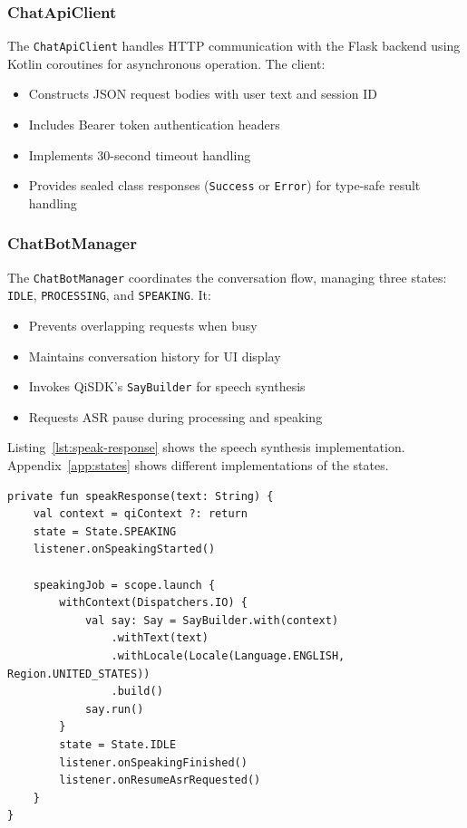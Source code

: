 \documentclass[a4paper]{article}
\begin{document}
\subsubsection{ChatApiClient}

The \texttt{ChatApiClient} handles HTTP communication with the Flask backend using Kotlin coroutines for asynchronous operation. The client:

\begin{itemize}[noitemsep]
    \item Constructs JSON request bodies with user text and session ID
    \item Includes Bearer token authentication headers
    \item Implements 30-second timeout handling
    \item Provides sealed class responses (\texttt{Success} or \texttt{Error}) for type-safe result handling
\end{itemize}

\subsubsection{ChatBotManager}

The \texttt{ChatBotManager} coordinates the conversation flow, managing three states: \texttt{IDLE}, \texttt{PROCESSING}, and \texttt{SPEAKING}. It:

\begin{itemize}[noitemsep]
    \item Prevents overlapping requests when busy
    \item Maintains conversation history for UI display
    \item Invokes QiSDK's \texttt{SayBuilder} for speech synthesis
    \item Requests ASR pause during processing and speaking
\end{itemize}

Listing~\ref{lst:speak-response} shows the speech synthesis implementation.\\
Appendix~\ref{app:states} shows different implementations of the states.
\begin{lstlisting}[style=kotlinstyle, caption={Speech synthesis using QiSDK in ChatBotManager}, label=lst:speak-response]
private fun speakResponse(text: String) {
    val context = qiContext ?: return
    state = State.SPEAKING
    listener.onSpeakingStarted()

    speakingJob = scope.launch {
        withContext(Dispatchers.IO) {
            val say: Say = SayBuilder.with(context)
                .withText(text)
                .withLocale(Locale(Language.ENGLISH, Region.UNITED_STATES))
                .build()
            say.run()
        }
        state = State.IDLE
        listener.onSpeakingFinished()
        listener.onResumeAsrRequested()
    }
}
\end{lstlisting}
\end{document}
